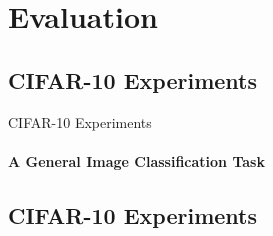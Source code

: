 \section{Evaluation}
\subsection{CIFAR-10 Experiments}
\begin{frame}{CIFAR-10 Experiments}
\framesubtitle{A General Image Classification Task}
  \vspace{-1em}
  \CifarDatasetSlide
\end{frame}


\subsection{CIFAR-10 Experiments}
